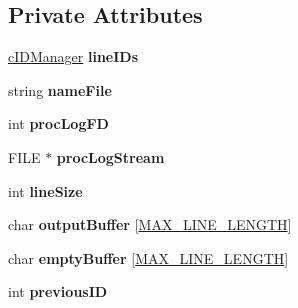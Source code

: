 \subsection*{\-Private \-Attributes}
\begin{DoxyCompactItemize}
\item 
\hypertarget{classcProcessLogger_a5b61b484e3c5717651a177ea1ec2ca69}{\hyperlink{classcIDManager}{c\-I\-D\-Manager} {\bfseries line\-I\-Ds}}\label{db/d63/classcProcessLogger_a5b61b484e3c5717651a177ea1ec2ca69}

\item 
\hypertarget{classcProcessLogger_ac68d6c8a7babfc2c7b1436b70d64f9c4}{string {\bfseries name\-File}}\label{db/d63/classcProcessLogger_ac68d6c8a7babfc2c7b1436b70d64f9c4}

\item 
\hypertarget{classcProcessLogger_a4cc3ded3e413aae6b9a15c4a0cd53ba2}{int {\bfseries proc\-Log\-F\-D}}\label{db/d63/classcProcessLogger_a4cc3ded3e413aae6b9a15c4a0cd53ba2}

\item 
\hypertarget{classcProcessLogger_a2f1e903bb826cf589126219d0c6fcec1}{\-F\-I\-L\-E $\ast$ {\bfseries proc\-Log\-Stream}}\label{db/d63/classcProcessLogger_a2f1e903bb826cf589126219d0c6fcec1}

\item 
\hypertarget{classcProcessLogger_aac5d5070fb04ae04e603f4fe1796d3d6}{int {\bfseries line\-Size}}\label{db/d63/classcProcessLogger_aac5d5070fb04ae04e603f4fe1796d3d6}

\item 
\hypertarget{classcProcessLogger_acb86cf10f34606edc4ed36ac13f04cfa}{char {\bfseries output\-Buffer} \mbox{[}\hyperlink{process__logger_8h_af0f2173e3b202ddf5756531b4471dcb2}{\-M\-A\-X\-\_\-\-L\-I\-N\-E\-\_\-\-L\-E\-N\-G\-T\-H}\mbox{]}}\label{db/d63/classcProcessLogger_acb86cf10f34606edc4ed36ac13f04cfa}

\item 
\hypertarget{classcProcessLogger_a78032b29ef5db92566bf51caa0e00d4e}{char {\bfseries empty\-Buffer} \mbox{[}\hyperlink{process__logger_8h_af0f2173e3b202ddf5756531b4471dcb2}{\-M\-A\-X\-\_\-\-L\-I\-N\-E\-\_\-\-L\-E\-N\-G\-T\-H}\mbox{]}}\label{db/d63/classcProcessLogger_a78032b29ef5db92566bf51caa0e00d4e}

\item 
\hypertarget{classcProcessLogger_ab577ec9c8c6895a580a718c7fffd59df}{int {\bfseries previous\-I\-D}}\label{db/d63/classcProcessLogger_ab577ec9c8c6895a580a718c7fffd59df}


\end{DoxyCompactItemize}
